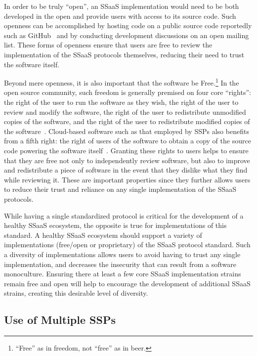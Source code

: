 In order to be truly ``open'', an SSaaS implementation would need to
be both developed in the open and provide users with access to its
source code. Such openness can be accomplished by hosting code on a
public source code reportedly such as GitHub~\cite{github} and by
conducting development discussions on an open mailing list. These
forms of openness ensure that users are free to review the
implementation of the SSaaS protocols themselves, reducing their need
to trust the software itself.

Beyond mere openness, it is also important that the software be
Free.\footnote{``Free'' as in freedom, not ``free'' as in beer.}  In
the open source community, such freedom is generally premised on four
core ``rights'': the right of the user to run the software as they
wish, the right of the user to review and modify the software, the
right of the user to redistribute unmodified copies of the software,
and the right of the user to redistribute modified copies of the
software~\cite{fsf-freedoms}. Cloud-based software such as that
employed by SSPs also benefits from a fifth right: the right of users
of the software to obtain a copy of the source code powering the
software itself~\cite{agpl}. Granting these rights to users helps to
ensure that they are free not only to independently review software,
but also to improve and redistribute a piece of software in the event
that they dislike what they find while reviewing it. These are
important properties since they further allows users to reduce their
trust and reliance on any single implementation of the SSaaS
protocols.

While having a single standardized protocol is critical for the
development of a healthy SSaaS ecosystem, the opposite is true for
implementations of this standard. A healthy SSaaS ecosystem should
support a variety of implementations (free/open or proprietary) of the
SSaaS protocol standard. Such a diversity of implementations allows
users to avoid having to trust any single implementation, and
decreases the insecurity that can result from a software
monoculture. Ensuring there at least a few core SSaaS implementation
strains remain free and open will help to encourage the development of
additional SSaaS strains, creating this desirable level of diversity.

\subsection{Use of Multiple SSPs}

